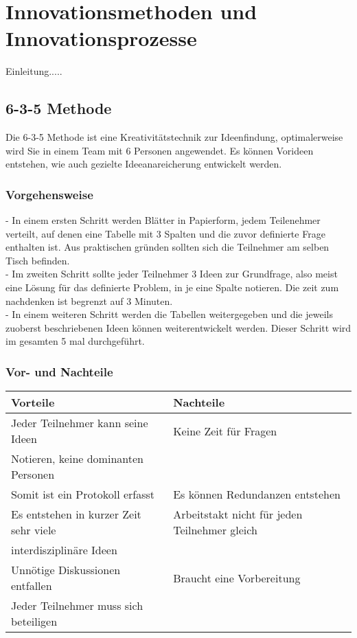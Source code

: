 \section{Innovationsmethoden und Innovationsprozesse}
Einleitung.....



\subsection{6-3-5 Methode}\label{subsec:635Methode}
Die 6-3-5 Methode ist eine Kreativitätstechnik zur Ideenfindung, optimalerweise wird Sie in einem Team mit 6 Personen angewendet. Es können Vorideen entstehen, wie auch gezielte Ideeanareicherung entwickelt werden.
\subsubsection{Vorgehensweise}
- In einem ersten Schritt werden Blätter in Papierform, jedem Teilenehmer verteilt, auf denen eine Tabelle mit 3 Spalten und die zuvor definierte Frage enthalten ist. Aus praktischen gründen sollten sich die Teilnehmer am selben Tisch befinden.\\
- Im zweiten Schritt sollte jeder Teilnehmer 3 Ideen zur Grundfrage, also meist eine Lösung für das definierte Problem, in je eine Spalte notieren. Die zeit zum nachdenken ist begrenzt auf 3 Minuten.\\
- In einem weiteren Schritt werden die Tabellen weitergegeben und die jeweils zuoberst beschriebenen Ideen können weiterentwickelt werden. Dieser Schritt wird im gesamten 5 mal durchgeführt.
\subsubsection{Vor- und Nachteile}
\begin{tabular}{|l|l|}
	\hline 
	Vorteile & Nachteile \\ 
	\hline 
	Jeder Teilnehmer kann seine Ideen & Keine Zeit für Fragen  \\
	 Notieren, keine dominanten Personen&\\ 
	\hline 
	Somit ist ein Protokoll erfasst&Es können Redundanzen entstehen \\ 
	\hline 
	Es entstehen in kurzer Zeit sehr viele&Arbeitstakt nicht für jeden Teilnehmer gleich\\
	interdisziplinäre Ideen&  \\ 
	\hline 
	Unnötige Diskussionen entfallen&Braucht eine Vorbereitung \\ 
	\hline 
	Jeder Teilnehmer muss sich beteiligen&  \\ 
	\hline 
\end{tabular} 
